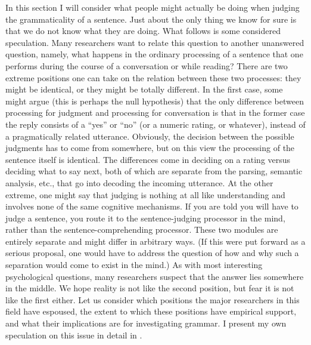 In this section I will consider what people might actually be doing when judging the grammaticality of a sentence. Just about the only thing we know for sure is that we do not know what they are doing. What follows is some considered speculation. Many researchers want to relate this question to another unanswered question, namely, what happens in the ordinary processing of a sentence that one performs  during the course of  a conversation  or while  reading? There are two
extreme positions one can take on the relation between these two processes: they might be identical, or they might be totally different. In the first case, some might argue (this is perhaps the null hypothesis) that the only difference between processing for judgment and processing for conversation is that in the former case the reply consists of a ``yes'' or ``no'' (or a numeric rating, or whatever), instead of a pragmatically related utterance. Obviously, the decision between the possible judgments has to come from somewhere, but on this view the processing of the sentence itself is identical. The differences come in deciding on a rating versus deciding what to say next, both of which are separate from the parsing, semantic analysis, etc., that go into decoding the incoming utterance. At the other extreme, one might say that judging is nothing at all like understanding and involves none of the same cognitive mechanisms. If you are told you will have to judge a sentence, you route it to the sentence-judging processor in the mind, rather than the sentence-comprehending processor. These two modules are entirely separate and might differ in arbitrary ways. (If this were put forward as a serious proposal, one would have to address the question of how and why such a separation would come to exist in the mind.) As with most interesting psychological questions, many researchers suspect that the answer lies somewhere in the middle. We hope reality is not like the second position, but fear it is not like the first either. Let us consider which positions the major researchers in this field have espoused, the extent to which these positions have empirical support, and what their implications are for investigating grammar. I present my own speculation on this issue in detail in .

